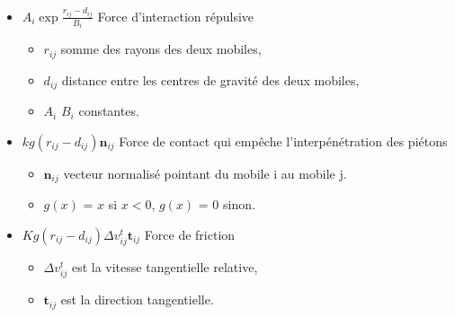 \begin{itemize}[leftmargin=1cm, label=, itemsep=0pt]%
\item  $A_i \exp{\frac{r_{ij}-d_{ij}}{B_i}}$ Force d'interaction répulsive
\begin{itemize}[leftmargin=1cm, label=, itemsep=0pt]%
\item  $r_{ij}$ somme des rayons des deux mobiles,
\item  $d_{ij}$ distance entre les centres de gravité des deux mobiles,
\item  $A_i$ $B_i$ constantes.
\end{itemize}
\item  $kg(r_{ij}-d_{ij})\mathbf{n}_{ij}$ Force de contact qui empêche l'interpénétration des piétons
\begin{itemize}[leftmargin=1cm, label=, itemsep=0pt]%
\item  $\mathbf{n}_{ij}$ vecteur normalisé pointant du mobile i au mobile j.
\item  $g(x)$ = $x$ si $x < 0$, $g(x)$ = $0$ sinon.
\end{itemize}
\item  $Kg(r_{ij}-d_{ij})\Delta v^t_{ij}\mathbf{t}_{ij}$ Force de friction
\begin{itemize}[leftmargin=1cm, label=, itemsep=0pt]%
\item  $\Delta v^t_{ij}$ est la vitesse tangentielle relative,
\item  $\mathbf{t}_{ij}$ est la direction tangentielle.
\end{itemize}
\end{itemize}
%
